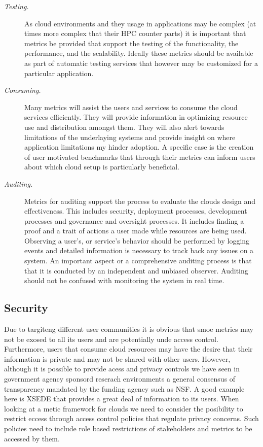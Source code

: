 \documentclass{sig-alternate-05-2015}
\begin{document}
\begin{description}
\item[\it  Testing.] As cloud environments and they usage in applications
  may be complex (at times more complex that their HPC counter parts)
  it is important that metrics be provided that support the testing of
  the functionality, the performance, and the scalability. Ideally
  these metrics should be available as part of automatic testing
  services that however may be customized for a particular application.

\item[\it  Consuming.] Many metrics will assist the users and services to
  consume the cloud services efficiently. They will provide
  information in optimizing resource use and distribution amongst
  them. They will also alert towards limitations of the underlaying
  systems and provide insight on where application limitations my
  hinder adoption. A specific case is the creation of user motivated
  benchmarks that through their metrics can inform users about which
  cloud setup is particularly beneficial.

\item[\it Auditing.] Metrics for auditing support the process to
  evaluate the clouds design and effectiveness. This includes
  security, deployment processes, development processes and governance
  and oversight processes.  It includes finding a proof and a trait of
  actions a user made while resources are being used. Observing a
  user's, or service's behavior should be performed by logging events
  and detailed information is necessary to track back any issues on a
  system.  An important aspect or a comprehensive auditing process is
  that that it is conducted by an independent and unbiased
  observer. Auditing should not be confused with monitoring the system
  in real time.

\end{description}


\subsection{Security}

Due to targiteng different user communities it is obvious that smoe
metrics may not be exosed to all its users and are potentially unde
access control. Furthermore, users that consume cloud resources may
have the desire that their information is private and may not be
shared with other users. However, although it is possible to provide
acess and privacy controls we have seen in government agency sponsord
reserach environments a general consensus of transparency mandated by
the funding agency such as NSF. A good example here is XSEDE that
provides a great deal of information to its users. When looking at a
metic framework for clouds we need to consider the posibility to
restrict eccess through access control policies that regulate privacy
concerns. Such policies need to include role based restrictions of
stakeholders and metrics to be accessed by them.
\end{document}
